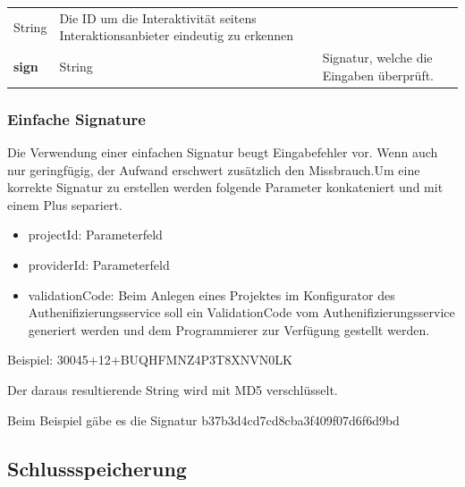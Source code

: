 \begin{longtable}[c]{@{}lll@{}}
\begin{minipage}[t]{0.17\columnwidth}
String
\strut\end{minipage} &
\begin{minipage}[t]{0.43\columnwidth}\raggedright\strut
Die ID um die Interaktivität seitens Interaktionsanbieter eindeutig zu
erkennen
\strut\end{minipage}\tabularnewline
\begin{minipage}[t]{0.30\columnwidth}\raggedright\strut
\textbf{sign}
\strut\end{minipage} &
\begin{minipage}[t]{0.17\columnwidth}\raggedright\strut
String
\strut\end{minipage} &
\begin{minipage}[t]{0.43\columnwidth}\raggedright\strut
Signatur, welche die Eingaben überprüft.
\strut\end{minipage}\tabularnewline
\bottomrule
\end{longtable}

\subsubsection{Einfache Signature}\label{einfache-signature}

Die Verwendung einer einfachen Signatur beugt Eingabefehler vor. Wenn
auch nur geringfügig, der Aufwand erschwert zusätzlich den Missbrauch.Um
eine korrekte Signatur zu erstellen werden folgende Parameter
konkateniert und mit einem Plus separiert.

\begin{itemize}
\tightlist
\item
  projectId: Parameterfeld
\item
  providerId: Parameterfeld
\item
  validationCode: Beim Anlegen eines Projektes im Konfigurator des
  Authenifizierungsservice soll ein ValidationCode vom
  Authenifizierungsservice generiert werden und dem Programmierer zur
  Verfügung gestellt werden.
\end{itemize}

Beispiel: 30045+12+BUQHFMNZ4P3T8XNVN0LK

Der daraus resultierende String wird mit MD5 verschlüsselt.

Beim Beispiel gäbe es die Signatur b37b3d4cd7cd8cba3f409f07d6f6d9bd

\hypertarget{schlussspeicherung}{\subsection{Schlussspeicherung}\label{schlussspeicherung}}

